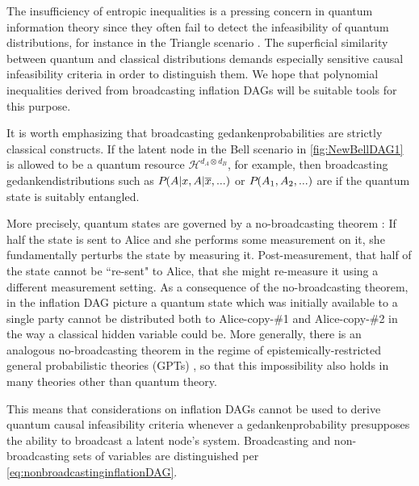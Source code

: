 The insufficiency of entropic inequalities is a pressing concern in quantum information theory since they often fail to detect the infeasibility of quantum distributions, for instance in the Triangle scenario \citep[Prob. 2.17]{fritz2012bell}. The superficial similarity between quantum and classical distributions demands especially sensitive causal infeasibility criteria in order to distinguish them. We hope that polynomial inequalities derived from broadcasting inflation DAGs will be suitable tools for this purpose.

It is worth emphasizing that broadcasting gedankenprobabilities %
are strictly classical constructs. If the latent node in the Bell scenario in \cref{fig:NewBellDAG1} is allowed to be a quantum resource $\mathcal{H}^{d_A\otimes d_B}$, for example, then broadcasting gedankendistributions such as ${P_{}}\lparen A|x , A|\overline{x},...\rparen$ or ${P_{}}\lparen A_1,A_2,...\rparen$ are  if the quantum state is suitably entangled.

More precisely, quantum states are governed by a no-broadcasting theorem \cite{NoCloningQuantum1996,NoCloningGeneral2006}: If half the state is sent to Alice and she performs some measurement on it, she fundamentally perturbs the state by measuring it. Post-measurement, that half of the state cannot be ``re-sent" to Alice, that she might re-measure it using a different measurement setting. As a consequence of the no-broadcasting theorem, in the inflation DAG picture a quantum state which was initially available to a single party cannot be distributed both to Alice-copy-\#1 and Alice-copy-\#2 in the way a classical hidden variable could be. More generally, there is an analogous no-broadcasting theorem in the regime of epistemically-restricted general probabilistic theories (GPTs) \cite{SpekkensToyTheory,NoCloningGeneral2006,Barnum2012GPT,Janotta2014GPT}, so that this impossibility also holds in many theories other than quantum theory.

This means that considerations on inflation DAGs cannot be used to derive quantum causal infeasibility criteria whenever a gedankenprobability presupposes the ability to broadcast a latent node's system. Broadcasting and non-broadcasting sets of variables are distinguished per \cref{eq:nonbroadcastinginflationDAG}.


